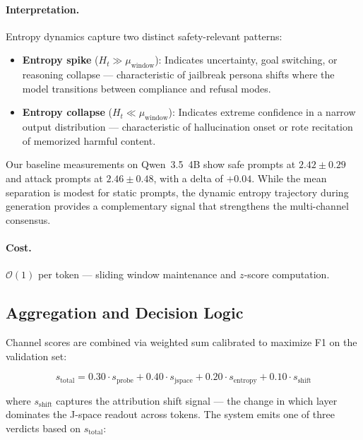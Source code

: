\documentclass[11pt]{article}
\begin{document}
\paragraph{Interpretation.}
Entropy dynamics capture two distinct safety-relevant patterns:
\begin{itemize}[nosep]
    \item \textbf{Entropy spike} ($H_t \gg \mu_{\text{window}}$): Indicates uncertainty, goal switching, or reasoning collapse — characteristic of jailbreak persona shifts where the model transitions between compliance and refusal modes.
    \item \textbf{Entropy collapse} ($H_t \ll \mu_{\text{window}}$): Indicates extreme confidence in a narrow output distribution — characteristic of hallucination onset or rote recitation of memorized harmful content.
\end{itemize}

Our baseline measurements on Qwen~3.5~4B show safe prompts at $2.42 \pm 0.29$ and attack prompts at $2.46 \pm 0.48$, with a delta of $+0.04$. While the mean separation is modest for static prompts, the dynamic entropy trajectory during generation provides a complementary signal that strengthens the multi-channel consensus.

\paragraph{Cost.}
$\mathcal{O}(1)$ per token — sliding window maintenance and $z$-score computation.

\subsection{Aggregation and Decision Logic}
\label{sec:aggregation}

Channel scores are combined via weighted sum calibrated to maximize F1 on the validation set:

\begin{equation}
s_{\text{total}} = 0.30 \cdot s_{\text{probe}} + 0.40 \cdot s_{\text{jspace}} + 0.20 \cdot s_{\text{entropy}} + 0.10 \cdot s_{\text{shift}}
\label{eq:aggregate}
\end{equation}

where $s_{\text{shift}}$ captures the attribution shift signal — the change in which layer dominates the J-space readout across tokens. The system emits one of three verdicts based on $s_{\text{total}}$:
\end{document}
